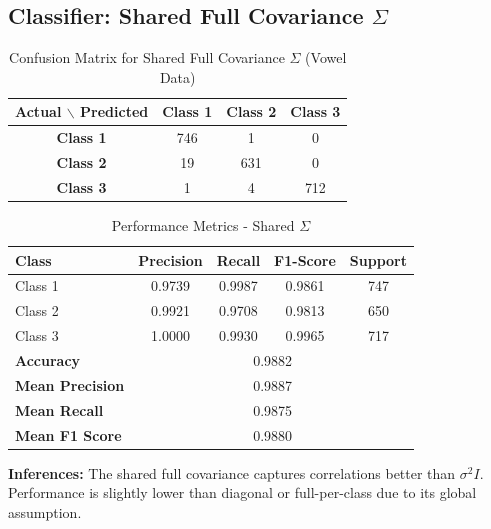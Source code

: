 \subsection{Classifier: Shared Full Covariance $\Sigma$}


\begin{table}[H]
\centering
\caption{Confusion Matrix for Shared Full Covariance $\Sigma$ (Vowel Data)}
\label{tab:confmat_d3_sigma2I}
\begin{tabular}{|c|c|c|c|}
\hline
\textbf{Actual $\backslash$ Predicted} & \textbf{Class 1} & \textbf{Class 2} & \textbf{Class 3} \\
\hline
\textbf{Class 1} & 746 & 1   & 0   \\
\textbf{Class 2} & 19  & 631 & 0   \\
\textbf{Class 3} & 1   & 4   & 712 \\
\hline
\end{tabular}
\end{table}

\begin{table}[H]
\centering
\caption{Performance Metrics - Shared $\Sigma$}
\begin{tabular}{lcccc}
\toprule
\textbf{Class} & \textbf{Precision} & \textbf{Recall} & \textbf{F1-Score} & \textbf{Support} \\
\midrule
Class 1 & 0.9739 & 0.9987 & 0.9861 & 747 \\
Class 2 & 0.9921 & 0.9708 & 0.9813 & 650 \\
Class 3 & 1.0000 & 0.9930 & 0.9965 & 717 \\
\midrule
\textbf{Accuracy} & \multicolumn{4}{c}{0.9882} \\
\textbf{Mean Precision} & \multicolumn{4}{c}{0.9887} \\
\textbf{Mean Recall} & \multicolumn{4}{c}{0.9875} \\
\textbf{Mean F1 Score} & \multicolumn{4}{c}{0.9880} \\
\bottomrule
\end{tabular}
\end{table}

\textbf{Inferences:} The shared full covariance captures correlations better than $\sigma^2 I$. Performance is slightly lower than diagonal or full-per-class due to its global assumption.

